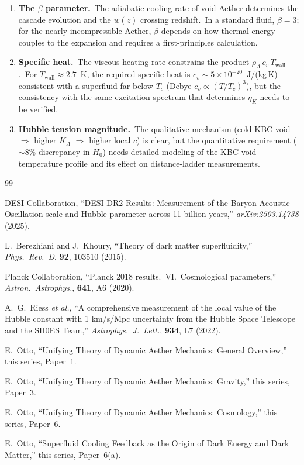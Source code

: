 \documentclass[12pt,letterpaper]{article}
\newcommand{\rhoa}{\rho_{\!A}}
\newcommand{\Ka}{K_{\!A}}
\newcommand{\etaK}{\eta_{\!K}}
\begin{document}
\begin{enumerate}[leftmargin=2em]
  \item \textbf{The $\beta$ parameter.}\ The adiabatic cooling rate of void
    Aether determines the cascade evolution and the $w(z)$ crossing redshift.\
    In a standard fluid, $\beta = 3$; for the nearly incompressible Aether,
    $\beta$ depends on how thermal energy couples to the expansion and
    requires a first-principles calculation.

  \item \textbf{Specific heat.}\ The viscous heating rate constrains the
    product $\rhoa\,c_v\,T_{\mathrm{wall}}$.\ For
    $T_{\mathrm{wall}} \approx 2.7$~K, the required specific heat is
    $c_v \sim 5 \times 10^{-20}$~J/(kg\,K)---consistent with a superfluid
    far below $T_c$ (Debye $c_v \propto (T/T_c)^3$), but the consistency
    with the same excitation spectrum that determines $\etaK$ needs to
    be verified.

  \item \textbf{Hubble tension magnitude.}\ The qualitative mechanism
    (cold KBC void $\Rightarrow$ higher $\Ka$ $\Rightarrow$ higher local
    $c$) is clear, but the quantitative requirement ($\sim$8\% discrepancy
    in $H_0$) needs detailed modeling of the KBC void temperature profile
    and its effect on distance-ladder measurements.
\end{enumerate}


\begin{thebibliography}{99}

DESI Collaboration,
``DESI DR2 Results: Measurement of the Baryon Acoustic Oscillation
scale and Hubble parameter across 11 billion years,''
\textit{arXiv:2503.14738} (2025).

L.~Berezhiani and J.~Khoury,
``Theory of dark matter superfluidity,''
\textit{Phys.\ Rev.\ D}, \textbf{92}, 103510 (2015).

Planck Collaboration,
``Planck 2018 results.\ VI.\ Cosmological parameters,''
\textit{Astron.\ Astrophys.}, \textbf{641}, A6 (2020).

A.~G.~Riess \textit{et al.},
``A comprehensive measurement of the local value of the Hubble constant
with 1 km/s/Mpc uncertainty from the Hubble Space Telescope and the SH0ES
Team,''
\textit{Astrophys.\ J.\ Lett.}, \textbf{934}, L7 (2022).

E.~Otto,
``Unifying Theory of Dynamic Aether Mechanics: General Overview,''
this series, Paper~1.

E.~Otto,
``Unifying Theory of Dynamic Aether Mechanics: Gravity,''
this series, Paper~3.

E.~Otto,
``Unifying Theory of Dynamic Aether Mechanics: Cosmology,''
this series, Paper~6.

E.~Otto,
``Superfluid Cooling Feedback as the Origin of Dark Energy and Dark Matter,''
this series, Paper~6(a).

\end{thebibliography}
\end{document}
